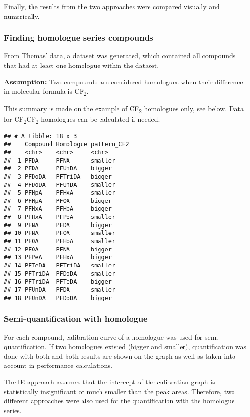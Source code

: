 \documentclass[
]{article}
\begin{document}
Finally, the results from the two approaches were compared visually and
numerically.

\hypertarget{finding-homologue-series-compounds}{%
\subsubsection{Finding homologue series
compounds}\label{finding-homologue-series-compounds}}

From Thomas' data, a dataset was generated, which contained all
compounds that had at least one homologue within the dataset.

\textbf{Assumption:} Two compounds are considered homologues when their
difference in molecular formula is CF\textsubscript{2}.

This summary is made on the example of CF\textsubscript{2} homologues
only, see below. Data for CF\textsubscript{2}CF\textsubscript{2}
homologues can be calculated if needed.

\begin{verbatim}
## # A tibble: 18 x 3
##    Compound Homologue pattern_CF2
##    <chr>    <chr>     <chr>      
##  1 PFDA     PFNA      smaller    
##  2 PFDA     PFUnDA    bigger     
##  3 PFDoDA   PFTriDA   bigger     
##  4 PFDoDA   PFUnDA    smaller    
##  5 PFHpA    PFHxA     smaller    
##  6 PFHpA    PFOA      bigger     
##  7 PFHxA    PFHpA     bigger     
##  8 PFHxA    PFPeA     smaller    
##  9 PFNA     PFDA      bigger     
## 10 PFNA     PFOA      smaller    
## 11 PFOA     PFHpA     smaller    
## 12 PFOA     PFNA      bigger     
## 13 PFPeA    PFHxA     bigger     
## 14 PFTeDA   PFTriDA   smaller    
## 15 PFTriDA  PFDoDA    smaller    
## 16 PFTriDA  PFTeDA    bigger     
## 17 PFUnDA   PFDA      smaller    
## 18 PFUnDA   PFDoDA    bigger
\end{verbatim}

\hypertarget{semi-quantification-with-homologue}{%
\subsubsection{Semi-quantification with
homologue}\label{semi-quantification-with-homologue}}

For each compound, calibration curve of a homologue was used for
semi-quantification. If two homologues existed (bigger and smaller),
quantification was done with both and both results are shown on the
graph as well as taken into account in performance calculations.

The IE approach assumes that the intercept of the calibration graph is
statistically insignificant or much smaller than the peak areas.
Therefore, two different approaches were also used for the
quantification with the homologue series.
\end{document}
